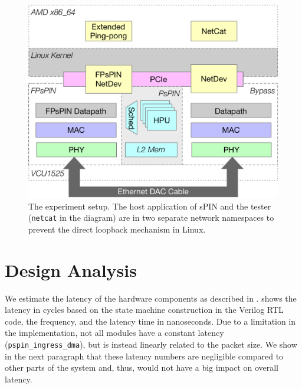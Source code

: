 \begin{figure}
    \centering
    \includegraphics[width=.9\linewidth]{figures/experiment-setup.pdf}
    \caption{The experiment setup.  The host application of sPIN and the tester (\texttt{netcat} in the diagram) are in two separate network namespaces to prevent the direct loopback mechanism in Linux.}
    \label{fig:experiment-setup}
\end{figure}

\section{Design Analysis} \label{sec:hw-analysis}



We estimate the latency of the hardware components as described in .   shows the latency in cycles based on the state machine construction in the Verilog RTL code, the frequency, and the latency time in nanoseconds.  Due to a limitation in the implementation, not all modules have a constant latency (\texttt{pspin\_ingress\_dma}), but is instead linearly related to the packet size.  We show in the next paragraph that these latency numbers are negligible compared to other parts of the system and, thus, would not have a big impact on overall latency.

